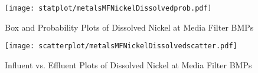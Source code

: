         \begin{figure}[hb]   %
            \centering
            \texttt{[image: statplot/metalsMFNickelDissolvedprob.pdf]}
            \caption{Box and Probability Plots of Dissolved Nickel at Media Filter BMPs}
        \end{figure}         %
        
        
        \begin{figure}[hb]   %
            \centering
            \texttt{[image: scatterplot/metalsMFNickelDissolvedscatter.pdf]}
            \caption{Influent vs. Effluent Plots of Dissolved Nickel at Media Filter BMPs}
        \end{figure}         %
        \clearpage
        